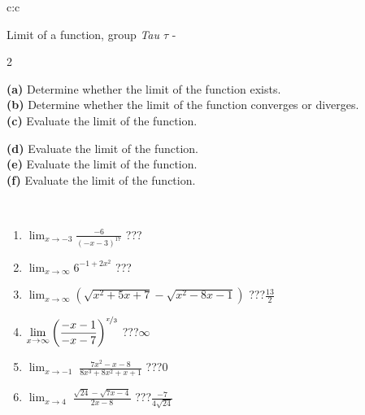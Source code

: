 \documentclass[10pt]{report}
\begin{document}
\newpage
\thispagestyle{empty}
\begin{tabular}{c:c}
\begin{minipage}[c][104.5mm][t]{0.5\linewidth}
\begin{center}
\vspace{5mm}
{\huge Limit of a function, group \textit{Tau $\tau$} -}\\[5mm]
\begin{minipage}{0.95\linewidth}
\begin{center}
{\small \begin{multicols}{2} \raggedright
\textbf{(a)} Determine whether the limit of the function exists. \\[1mm]
\textbf{(b)} Determine whether the limit of the function converges or diverges. \\[1mm]
\textbf{(c)} Evaluate the limit of the function. \par \columnbreak
\textbf{(d)} Evaluate the limit of the function. \\[1mm]
\textbf{(e)} Evaluate the limit of the function. \\[1mm]
\textbf{(f)} Evaluate the limit of the function. \\[1mm]
\end{multicols}
}
\end{center}
\end{minipage}
\\[1mm]
\begin{minipage}{0.79\linewidth}
\begin{center}
\begin{varwidth}{\linewidth}
\setlength{\itemsep}{0pt}
\begin{enumerate}
\normalsize
\item $\displaystyle\lim_{x\to-3}{\frac{-6}{(-x-3)^{17}}}$\quad \dotfill\; ???\;\dotfill \quad {}
\item $\displaystyle\lim_{x\to\infty}{6^{-1+2x^2}}$\quad \dotfill\; ???\;\dotfill \quad {}
\item $\displaystyle\lim_{x\to\infty}{\left(\sqrt{x^2+5x+7} - \sqrt{x^2-8x-1}\right)}$\quad \dotfill\; ???\;\dotfill \quad $\frac{13}{2}$
\item $\displaystyle\lim_{x\to\infty}{\left( \frac{-x-1}{-x-7} \right)^{\nicefrac{x}{3}}}$\quad \dotfill\; ???\;\dotfill \quad $\infty$
\item $\displaystyle\lim_{x\to -1}{\;\frac{7x^2-x-8}{8x^3+8x^2+x+1}}$\quad \dotfill\; ???\;\dotfill \quad $0$
\item $\displaystyle\lim_{x\to 4}{\;\frac{\sqrt{24}-\sqrt{7x-4}}{2x-8}}$\quad \dotfill\; ???\;\dotfill \quad $\frac{-7}{4\sqrt{24}}$

\end{enumerate}
\end{varwidth}
\end{center}
\end{minipage}
\end{center}
\end{minipage}
\end{tabular}
\end{document}
